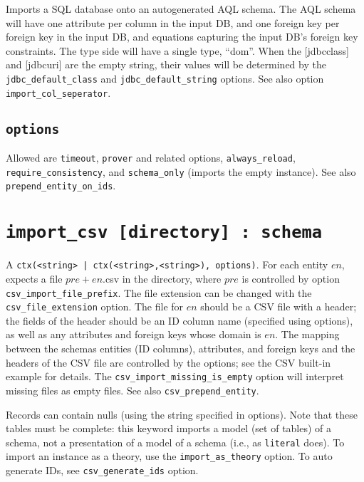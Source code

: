 \documentclass[10pt]{book}
\begin{document}
Imports a SQL database onto an autogenerated AQL schema.  The AQL schema will have one attribute per column in the input DB, and one foreign key per foreign key in the input DB, and equations capturing the input DB's foreign key constraints.  The type side will have a single type, ``dom''.  When the [jdbcclass] and [jdbcuri] are the empty string, their values will be determined by the {\tt jdbc\_default\_class} and {\tt jdbc\_default\_string} options.  See also option {\tt import\_col\_seperator}.

\subsection{{\tt options}}
Allowed are {\tt timeout}, {\tt prover} and related options, {\tt always\_reload}, {\tt require\_consistency}, and {\tt schema\_only} (imports the empty instance).  See also {\tt prepend\_entity\_on\_ids}.

\section{{\tt import\_csv [directory] : schema}}
A {\tt ctx(<string> | ctx(<string>,<string>), options)}.  For each entity $en$, expects a file $pre + en$.csv in the directory, where $pre$ is controlled by option {\tt csv\_import\_file\_prefix}.  The file extension can be changed with the {\tt csv\_file\_extension} option.  The file for $en$ should be a CSV file with a header; the fields of the header should be an ID column name (specified using options), as well as any attributes and foreign keys whose domain is $en$.  The mapping between the schemas entities (ID columns), attributes, and foreign keys and the headers of the CSV file are controlled by the options; see the CSV built-in example for details.  The {\tt csv\_import\_missing\_is\_empty} option will interpret missing files as empty files.  See also {\tt csv\_prepend\_entity}. 

Records can contain nulls (using the string specified in options).  Note that these tables must be complete: this keyword imports a model (set of tables) of a schema, not a presentation of a model of a schema (i.e., as {\tt literal} does).  To import an instance as a theory, use the {\tt import\_as\_theory} option.  To auto generate IDs, see {\tt csv\_generate\_ids} option.
\end{document}
